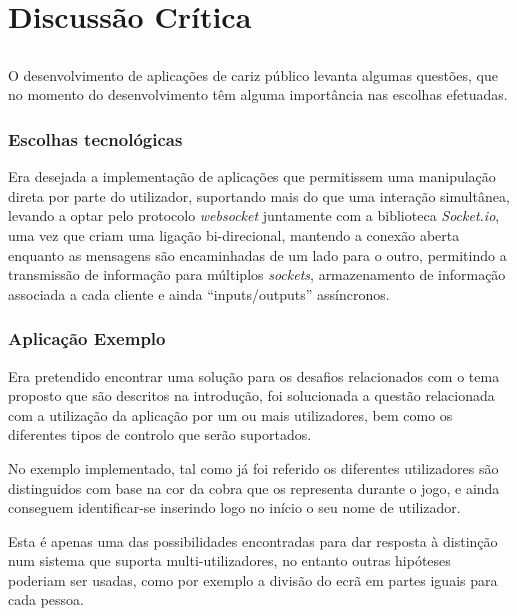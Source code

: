 \chapter{Discussão Crítica} \label{chap:disc}

\section*{}

O desenvolvimento de aplicações de cariz público levanta algumas questões, que no momento do desenvolvimento têm alguma importância nas escolhas efetuadas.

\subsection*{Escolhas tecnológicas}


Era desejada a implementação de aplicações que permitissem uma manipulação direta por parte do utilizador, suportando mais do que uma interação simultânea, levando a optar pelo protocolo \textit{websocket} juntamente com a biblioteca \textit{Socket.io}, uma vez que criam uma ligação bi-direcional, mantendo a conexão aberta enquanto as mensagens são encaminhadas de um lado para o outro, permitindo a transmissão de informação para múltiplos \textit{sockets}, armazenamento de informação associada a cada cliente e ainda “inputs/outputs” assíncronos. 

\subsection*{Aplicação Exemplo}

Era pretendido encontrar uma solução para os desafios relacionados com o tema proposto que são descritos na introdução, foi solucionada a questão relacionada com a utilização da aplicação por um ou mais utilizadores, bem como os diferentes tipos de controlo que serão suportados.

No exemplo implementado, tal como já foi referido os diferentes utilizadores são distinguidos com base na cor da cobra que os representa durante o jogo, e ainda conseguem identificar-se inserindo logo no início o seu nome de utilizador. 

Esta é apenas uma das possibilidades encontradas para dar resposta à distinção num sistema que suporta multi-utilizadores, no entanto outras hipóteses poderiam ser usadas, como por exemplo a divisão do ecrã em partes iguais para cada pessoa.

